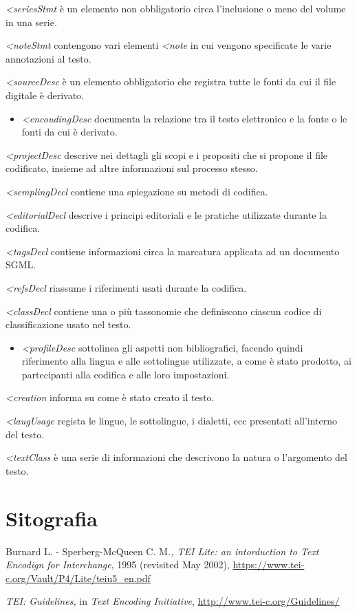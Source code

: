 \emph{\textless{}seriesStmt} è un elemento non
obbligatorio circa l'inclusione o meno del volume in una serie.

\emph{\textless{}noteStmt} contengono vari elementi
\emph{\textless{}note} in cui vengono specificate le varie
annotazioni al testo.

\emph{\textless{}sourceDesc} è un elemento obbligatorio
che registra tutte le fonti da cui il file digitale è derivato.

\begin{itemize}
\item
  \emph{\textless{}encoudingDesc} documenta la relazione
  tra il testo elettronico e la fonte o le fonti da cui è derivato.
\end{itemize}

\emph{\textless{}projectDesc} descrive nei dettagli gli
scopi e i propositi che si propone il file codificato, insieme ad altre
informazioni sul processo stesso.

\emph{\textless{}semplingDecl} contiene una spiegazione su
metodi di codifica.

\emph{\textless{}editorialDecl} descrive i principi
editoriali e le pratiche utilizzate durante la codifica.

\emph{\textless{}tagsDecl} contiene informazioni circa la
marcatura applicata ad un documento SGML.

\emph{\textless{}refsDecl} riassume i riferimenti usati
durante la codifica.

\emph{\textless{}classDecl} contiene una o più tassonomie
che definiscono ciascun codice di classificazione usato nel testo.

\begin{itemize}
\item
  \emph{\textless{}profileDesc} sottolinea gli aspetti non
  bibliografici, facendo quindi riferimento alla lingua e alle
  sottolingue utilizzate, a come è stato prodotto, ai partecipanti alla
  codifica e alle loro impostazioni.
\end{itemize}

\emph{\textless{}creation} informa su come è stato creato
il testo.

\emph{\textless{}laugUsage} regista le lingue, le
sottolingue, i dialetti, ecc presentati all'interno del testo.

\emph{\textless{}textClass} è una serie di informazioni
che descrivono la natura o l'argomento del testo.

\section*{Sitografia}
{\parindent0pt 
Burnard L. - Sperberg-McQueen C. M\emph{., TEI Lite: an intorduction to
Text Encodign for Interchange}, 1995 (revisited May 2002),
\url{https://www.tei-c.org/Vault/P4/Lite/teiu5_en.pdf}

\emph{TEI: Guidelines,} in \emph{Text Encoding Initiative},
\url{http://www.tei-c.org/Guidelines/}
}

